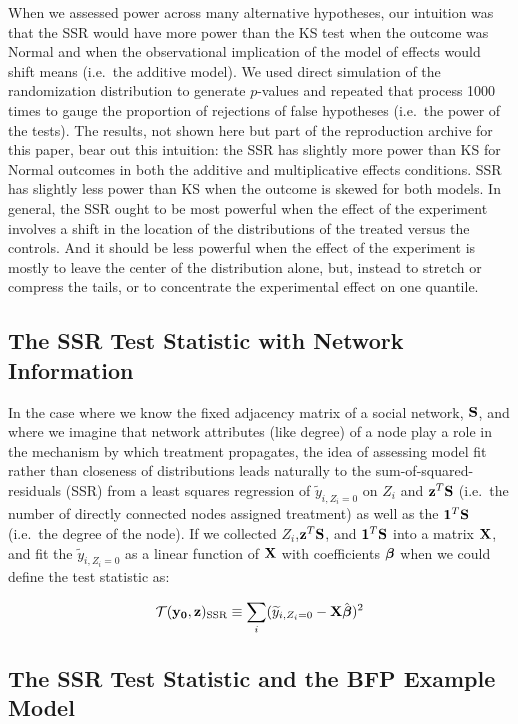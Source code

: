 When we assessed power across many alternative hypotheses, our intuition was that the SSR
would have more power than the KS test when the outcome was Normal and when
the observational implication of the model of effects would shift means (i.e.\
the additive model). We used direct simulation of the randomization
distribution to generate $p$-values and repeated that process 1000 times to
gauge the proportion of rejections of false hypotheses (i.e.\ the power of the
tests). The results, not shown here but part of the reproduction archive for
this paper, bear out this intuition: the SSR has slightly more power than KS
for Normal outcomes in both the additive and multiplicative effects
conditions. SSR has slightly less power than KS when the outcome is skewed for
both models. In general, the SSR ought to be most powerful when the effect of
the experiment involves a shift in the location of the distributions of the
treated versus the controls. And it should be less powerful when the effect of
the experiment is mostly to leave the center of the distribution alone, but,
instead to stretch or compress the tails, or to concentrate the experimental
effect on one quantile.

\subsection{The SSR Test Statistic with Network Information}

In the case where we know the fixed adjacency matrix of a social network,
$\mathbf{S}$, and where we imagine that network attributes (like degree) of a node
play a role in the mechanism by which treatment propagates, the idea of
assessing model fit rather than closeness of distributions leads naturally to
the sum-of-squared-residuals (SSR) from a least squares regression of $
\widetilde y_{i,Z_i=0}$ on $Z_{i}$ and $\mathbf{z}^{T} \mathbf{S}$ (i.e.\ the number of
directly connected nodes assigned treatment) as well as the $\mathbf{1}^{T}
\mathbf{S}$ (i.e.\ the degree of the node). If we collected $Z_{i}$,$\mathbf{z}^{T} \mathbf{S}$,
and $\mathbf{1}^{T} \mathbf{S}$ into a matrix $\mathbf{X}$, and fit the $\widetilde
y_{i,Z_i=0}$ as a linear function of $\mathbf{X}$ with coefficients $\boldsymbol{\beta}$ when we
could define the test statistic as:

\begin{equation}
 \mathcal{T}(\mathbf{y}_{\mathbf{0}},\mathbf{z})_{\text{SSR}} \equiv \sum_{i} ( \widetilde y_{i,Z_i=0} - \mathbf{X}\hat{\boldsymbol{\beta}} )^2 \label{eq:ssr}
\end{equation}


\subsection{The SSR Test Statistic and the BFP Example Model}

